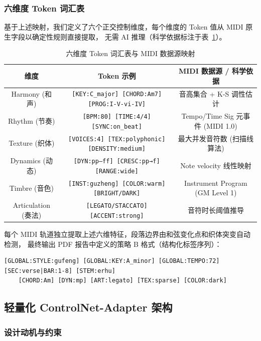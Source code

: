 \documentclass[UTF8,12pt,a4paper]{ctexart}
\begin{document}
\subsubsection{六维度 Token 词汇表}

基于上述映射，我们定义了六个正交控制维度，每个维度的 Token 值从 MIDI 原生字段以确定性规则直接提取，
无需 AI 推理（科学依据标注于表~\ref{tab:token_vocab}）。

\begin{table}[H]
\centering
\caption{六维度 Token 词汇表与 MIDI 数据源映射}
\label{tab:token_vocab}
\begin{tabular}{c|c|c}
\toprule
\textbf{维度} & \textbf{Token 示例} & \textbf{MIDI 数据源 / 科学依据} \\
\midrule
Harmony (和声) & \texttt{[KEY:C\_major] [CHORD:Am7] [PROG:I-V-vi-IV]} & 音高集合 + K-S 调性估计 \cite{krumhansl} \\
Rhythm (节奏) & \texttt{[BPM:80] [TIME:4/4] [SYNC:on\_beat]} & Tempo/Time Sig 元事件 (MIDI 1.0) \\
Texture (织体) & \texttt{[VOICES:4] [TEX:polyphonic] [DENSITY:medium]} & 最大并发音符数 (扫描线算法) \\
Dynamics (动态) & \texttt{[DYN:pp--ff] [CRESC:pp→f] [RANGE:wide]} & Note velocity 线性映射 \cite{maestro} \\
Timbre (音色) & \texttt{[INST:guzheng] [COLOR:warm] [BRIGHT/DARK]} & Instrument Program (GM Level 1) \\
Articulation (奏法) & \texttt{[LEGATO/STACCATO] [ACCENT:strong]} & 音符时长阈值推导 \cite{groove} \\
\bottomrule
\end{tabular}
\end{table}

每个 MIDI 轨道独立提取上述六维特征，段落边界由和弦变化点和织体突变自动检测，
最终输出 PDF 报告中定义的策略 B 格式（结构化标签序列）：

\begin{verbatim}
[GLOBAL:STYLE:gufeng] [GLOBAL:KEY:A_minor] [GLOBAL:TEMPO:72]
[SEC:verse|BAR:1-8] [STEM:erhu]
    [CHORD:Am] [DYN:mp] [ART:legato] [TEX:sparse] [COLOR:dark]
\end{verbatim}

\subsection{轻量化 ControlNet-Adapter 架构}

\subsubsection{设计动机与约束}
\end{document}
